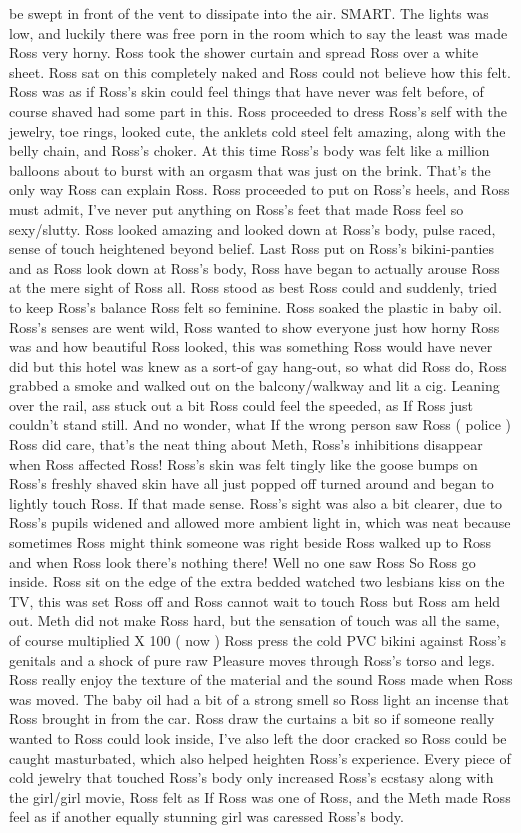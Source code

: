 \documentclass[12pt]{book}
\begin{document}
be swept in front of the vent to dissipate into the air. SMART. The lights was low, and luckily there was free porn in the room which to say the least was made Ross very horny. Ross took the shower curtain and spread Ross over a white sheet. Ross sat on this completely naked and Ross could not believe how this felt. Ross was as if Ross's skin could feel things that have never was felt before, of course shaved had some part in this. Ross proceeded to dress Ross's self with the jewelry, toe rings, looked cute, the anklets cold steel felt amazing, along with the belly chain, and Ross's choker. At this time Ross's body was felt like a million balloons about to burst with an orgasm that was just on the brink. That's the only way Ross can explain Ross. Ross proceeded to put on Ross's heels, and Ross must admit, I've never put anything on Ross's feet that made Ross feel so sexy/slutty. Ross looked amazing and looked down at Ross's body, pulse raced, sense of touch heightened beyond belief. Last Ross put on Ross's bikini-panties and as Ross look down at Ross's body, Ross have began to actually arouse Ross at the mere sight of Ross all. Ross stood as best Ross could and suddenly, tried to keep Ross's balance Ross felt so feminine. Ross soaked the plastic in baby oil. Ross's senses are went wild, Ross wanted to show everyone just how horny Ross was and how beautiful Ross looked, this was something Ross would have never did but this hotel was knew as a sort-of gay hang-out, so what did Ross do, Ross grabbed a smoke and walked out on the balcony/walkway and lit a cig. Leaning over the rail, ass stuck out a bit Ross could feel the speeded, as If Ross just couldn't stand still. And no wonder, what If the wrong person saw Ross ( police ) Ross did care, that's the neat thing about Meth, Ross's inhibitions disappear when Ross affected Ross! Ross's skin was felt tingly like the goose bumps on Ross's freshly shaved skin have all just popped off turned around and began to lightly touch Ross. If that made sense. Ross's sight was also a bit clearer, due to Ross's pupils widened and allowed more ambient light in, which was neat because sometimes Ross might think someone was right beside Ross walked up to Ross and when Ross look there's nothing there! Well no one saw Ross So Ross go inside. Ross sit on the edge of the extra bedded watched two lesbians kiss on the TV, this was set Ross off and Ross cannot wait to touch Ross but Ross am held out. Meth did not make Ross hard, but the sensation of touch was all the same, of course multiplied X 100 ( now ) Ross press the cold PVC bikini against Ross's genitals and a shock of pure raw Pleasure moves through Ross's torso and legs. Ross really enjoy the texture of the material and the sound Ross made when Ross was moved. The baby oil had a bit of a strong smell so Ross light an incense that Ross brought in from the car. Ross draw the curtains a bit so if someone really wanted to Ross could look inside, I've also left the door cracked so Ross could be caught masturbated, which also helped heighten Ross's experience. Every piece of cold jewelry that touched Ross's body only increased Ross's ecstasy along with the girl/girl movie, Ross felt as If Ross was one of Ross, and the Meth made Ross feel as if another equally stunning girl was caressed Ross's body. 
\end{document}
